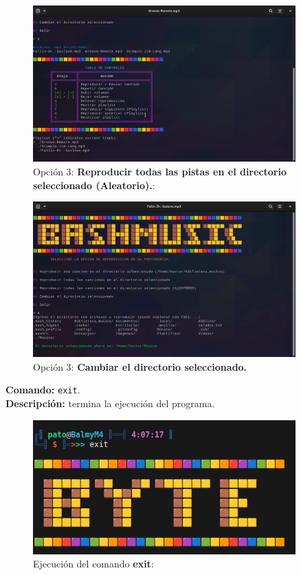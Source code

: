 \documentclass[titlepage]{article}
\begin{document}
\begin{figure}[H]
    \centering
    \includegraphics[width=0.9\textwidth]{bashmusic_3.png}
    \caption{Opción 3:  \textbf{Reproducir todas las pistas en el directorio seleccionado (Aleatorio).}:}
    \label{fig:ejemplo3}
\end{figure}

\begin{figure}[H]
    \centering
    \includegraphics[width=0.9\textwidth]{bashmusic_4.png}
    \caption{Opción 3:  \textbf{Cambiar el directorio seleccionado.}}
    \label{fig:ejemplo4}
\end{figure}

\noindent
\textbf{Comando:} \verb|exit|. \\
\textbf{Descripción:} termina la ejecución del programa.           

\begin{figure}[H]
    \centering
    \includegraphics[width=0.9\textwidth]{exit.png}
    \caption{Ejecución del comando \textbf{exit}:}
    \label{fig:ejemplo}
\end{figure}
 
\end{document}

